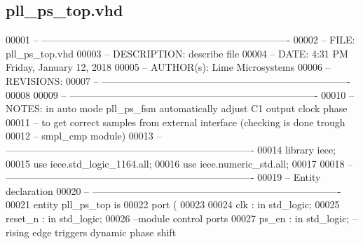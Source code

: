 \subsection{pll\+\_\+ps\+\_\+top.\+vhd}
\label{pll__ps__top_8vhd_source}

\begin{DoxyCode}
00001 \textcolor{keyword}{-- ----------------------------------------------------------------------------}
00002 \textcolor{keyword}{-- FILE:          pll\_ps\_top.vhd}
00003 \textcolor{keyword}{-- DESCRIPTION:   describe file}
00004 \textcolor{keyword}{-- DATE:          4:31 PM Friday, January 12, 2018}
00005 \textcolor{keyword}{-- AUTHOR(s):     Lime Microsystems}
00006 \textcolor{keyword}{-- REVISIONS:}
00007 \textcolor{keyword}{-- ----------------------------------------------------------------------------}
00008 
00009 \textcolor{keyword}{-- ----------------------------------------------------------------------------}
00010 \textcolor{keyword}{--NOTES: in auto mode pll\_ps\_fsm automatically adjust C1 output clock phase}
00011 \textcolor{keyword}{-- to get correct samples from external interface (checking is done trough }
00012 \textcolor{keyword}{-- smpl\_cmp module)}
00013 \textcolor{keyword}{-- ----------------------------------------------------------------------------}
00014 \textcolor{vhdlkeyword}{library }\textcolor{keywordflow}{ieee};
00015 \textcolor{vhdlkeyword}{use }ieee.std\_logic\_1164.\textcolor{keywordflow}{all};
00016 \textcolor{vhdlkeyword}{use }ieee.numeric\_std.\textcolor{keywordflow}{all};
00017 
00018 \textcolor{keyword}{-- ----------------------------------------------------------------------------}
00019 \textcolor{keyword}{-- Entity declaration}
00020 \textcolor{keyword}{-- ----------------------------------------------------------------------------}
00021 \textcolor{keywordflow}{entity }pll_ps_top \textcolor{keywordflow}{is}
00022    \textcolor{keywordflow}{port} \textcolor{vhdlchar}{(}
00023 
00024       \textcolor{vhdlchar}{clk}                           \textcolor{vhdlchar}{:} \textcolor{keywordflow}{in} \textcolor{comment}{std\_logic};
00025       \textcolor{vhdlchar}{reset_n}                       \textcolor{vhdlchar}{:} \textcolor{keywordflow}{in} \textcolor{comment}{std\_logic};
00026 \textcolor{keyword}{      --module control ports}
00027       \textcolor{vhdlchar}{ps_en}                         \textcolor{vhdlchar}{:} \textcolor{keywordflow}{in} \textcolor{comment}{std\_logic};\textcolor{keyword}{ -- rising edge triggers dynamic phase shift}

\end{DoxyCode}
